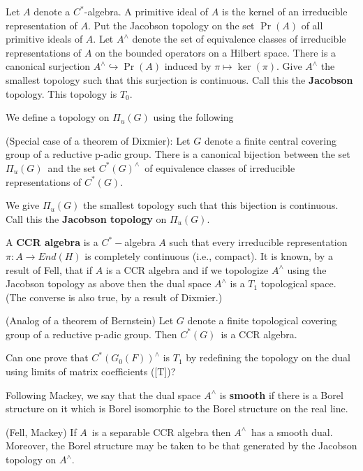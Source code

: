 Let $A$ denote a $C^{*}$-algebra. A primitive ideal of $A$ is the kernel of
an irreducible representation of $A$. Put the Jacobson topology on the set $%
\Pr (A)$ of all primitive ideals of $A$. Let $A^{\wedge }$ denote the set of
equivalence classes of irreducible representations of $A$ on the bounded
operators on a Hilbert space. There is a canonical surjection $A^{\wedge
}\hookrightarrow \Pr (A)$ induced by $\pi \longmapsto \ker (\pi ).$ Give $%
A^{\wedge }$ the smallest topology such that this surjection is continuous.
Call this the {\bf Jacobson} topology. This topology is $T_0$.

We define a topology on $\Pi _u(G)$ using the following

\begin{lemma}
(Special case of a theorem of Dixmier): Let $G$ denote a finite central
covering group of a reductive p-adic group. There is a canonical bijection
between the set $\Pi _u(G)$\ and the set $C^{*}(G)^{\wedge }$\ of
equivalence classes of irreducible representations of $C^{*}(G).$
\end{lemma}

We give $\Pi _u(G)$ the smallest topology such that this bijection is
continuous. Call this the {\bf Jacobson topology} on $\Pi _u(G).$

A {\bf CCR algebra} is a $C^{*}-$algebra $A$ such that every irreducible
representation $\pi :A\rightarrow End(H)$ is completely continuous (i.e.,
compact). It is known, by a result of Fell, that if $A$ is a CCR algebra and
if we topologize $A^{\wedge }$ using the Jacobson topology as above then the
dual space $A^{\wedge }$ is a $T_1$ topological space. (The converse is also
true, by a result of Dixmier.)

\begin{conjecture}
(Analog of a theorem of Bernstein) Let $G$ denote a finite topological
covering group of a reductive p-adic group. Then $C^{*}(G)$\ is a CCR
algebra.
\end{conjecture}

\begin{remark}
Can one prove that $C^{*}(G_0(F))^{\wedge }$ is $T_1$ by redefining the
topology on the dual using limits of matrix coefficients ([T])?
\end{remark}

Following Mackey, we say that the dual space $A^{\wedge }$ is {\bf smooth}
if there is a Borel structure on it which is Borel isomorphic to the Borel
structure on the real line.

\begin{lemma}
(Fell, Mackey) If $A$\ is a separable CCR algebra then $A^{\wedge }$\ has a
smooth dual. Moreover, the Borel structure may be taken to be that generated
by the Jacobson topology on $A^{\wedge }.$
\end{lemma}

